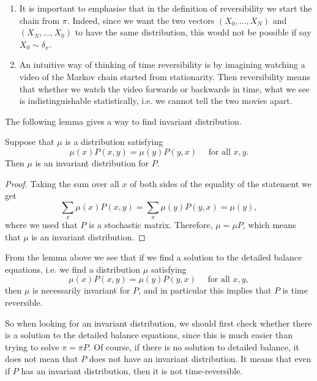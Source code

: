 \documentclass[a4paper]{article}
\begin{document}
\begin{remark}
    \begin{enumerate}
        \item It is important to emphasise that in the definition of reversibility we start the chain from $\pi$. Indeed, since we want the two vectors $\left(X_0, \ldots, X_N\right)$ and $\left(X_N, \ldots, X_0\right)$ to have the same distribution, this would not be possible if say $X_0 \sim \delta_x$.

        \item An intuitive way of thinking of time reversibility is by imagining watching a video of the Markov chain started from stationarity. Then reversibility means that whether we watch the video forwards or backwards in time, what we see is indistinguishable statistically, i.e. we cannot tell the two movies apart.
    \end{enumerate}
\end{remark}

The following lemma gives a way to find invariant distribution. 

\begin{lemma}
    Suppose that $\mu$ is a distribution satisfying
    \[
    \mu(x) P(x, y)=\mu(y) P(y, x) \quad \text { for all } x, y .
    \]
    Then $\mu$ is an invariant distribution for $P$.
\end{lemma}
\begin{proof}
    Taking the sum over all $x$ of both sides of the equality of the statement we get
    \[
    \sum_x \mu(x) P(x, y)=\sum_x \mu(y) P(y, x)=\mu(y),
    \]
    where we used that $P$ is a stochastic matrix. Therefore, $\mu=\mu P$, which means that $\mu$ is an invariant distribution.
\end{proof}

\begin{remark}
    From the lemma above we see that if we find a solution to the detailed balance equations, i.e. we find a distribution $\mu$ satisfying
    \[
    \mu(x) P(x, y)=\mu(y) P(y, x) \quad \text { for all } x, y,
    \]
    then $\mu$ is necessarily invariant for $P$, and in particular this implies that $P$ is time reversible. 
    
    So when looking for an invariant distribution, we should first check whether there is a solution to the detailed balance equations, since this is much easier than trying to solve $\pi=\pi P$. Of course, if there is no solution to detailed balance, it does not mean that $P$ does not have an invariant distribution. It means that even if $P$ has an invariant distribution, then it is not time-reversible.
\end{remark}
\end{document}
